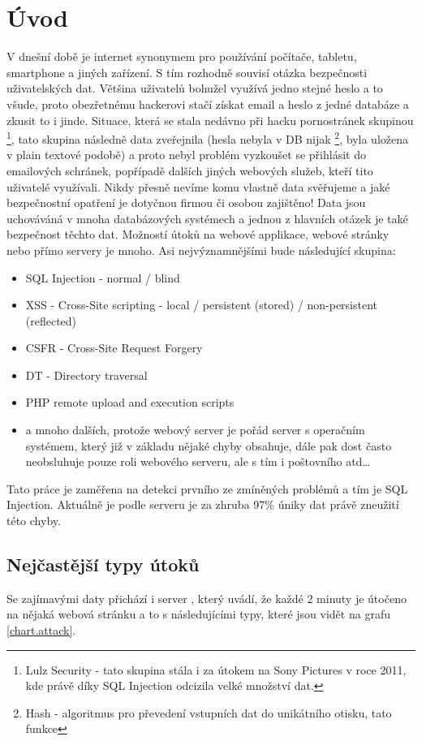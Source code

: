 \documentclass[12pt, a4paper]{report}
\begin{document}
\chapter{Úvod}
V dnešní době je internet synonymem pro používání počítače, tabletu, smartphone a jiných zařízení. S tím rozhodně souvisí otázka bezpečnosti uživatelských dat. Většina uživatelů bohužel využívá jedno stejné heslo a to všude, proto obezřetnému hackerovi stačí získat email a heslo z jedné databáze a zkusit to i jinde. Situace, která se stala nedávno při hacku pornostránek skupinou \footnote{Lulz Security - tato skupina stála i za útokem na Sony Pictures v roce 2011, kde právě díky SQL Injection odcizila velké množství dat.}, tato skupina následně data zveřejnila (hesla nebyla v DB nijak \footnote{Hash - algoritmus pro převedení vstupních dat do unikátního otisku, tato funkce }, byla uložena v plain textové podobě) a proto nebyl problém vyzkoušet se přihlásit do emailových schránek, popřípadě dalších jiných webových služeb, kteří tito uživatelé využívali. Nikdy přesně nevíme komu vlastně  data svěřujeme a jaké bezpečnostní opatření je dotyčnou firmou či osobou zajištěno! Data jsou uchováváná v mnoha databázových systémech a jednou z hlavních otázek je také bezpečnost těchto dat. Možností útoků na webové applikace, webové stránky nebo přímo servery je mnoho.  Asi nejvýznamnějšími bude následující skupina:
\begin{itemize}
\item SQL Injection - normal / blind
\item XSS - Cross-Site scripting - local / persistent (stored) / non-persistent (reflected)
\item CSFR - Cross-Site Request Forgery 
\item DT - Directory traversal
\item PHP remote upload and execution scripts
\item a mnoho dalších, protože webový server je pořád server s operačním systémem, který již v základu nějaké chyby obsahuje, dále pak dost často neobsluhuje pouze roli webového serveru, ale s tím i poštovního atd\ldots
\end{itemize}
Tato práce je zaměřena na detekci prvního ze zmíněných problémů a tím je SQL Injection. Aktuálně je podle serveru  je za zhruba 97\% úniky dat právě zneužití této chyby. 

\section{Nejčastější typy útoků}
Se zajímavými daty přichází i server , který uvádí, že každé 2 minuty je útočeno na nějaká webová stránku a to s následujícími typy, které jsou vidět na grafu \ref{chart.attack}.
\end{document}
